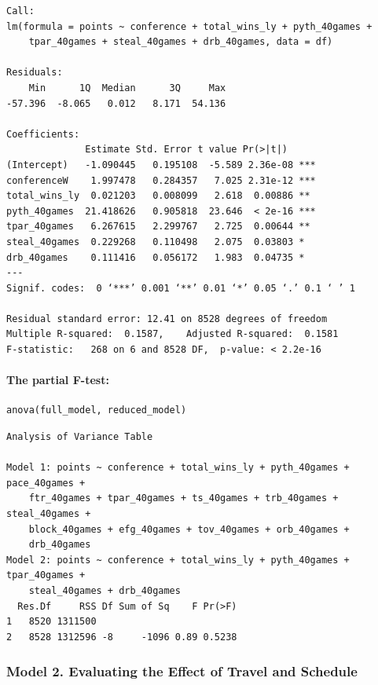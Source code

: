 \documentclass[
    12pt,
    a4paper,
    titlepage,  %
    abstract,  %
    headings=standardclasses,  %
    bibliography=totocnumbered  %
]{scrartcl}
\begin{document}
\begin{Verbatim}
Call:
lm(formula = points ~ conference + total_wins_ly + pyth_40games + 
    tpar_40games + steal_40games + drb_40games, data = df)

Residuals:
    Min      1Q  Median      3Q     Max 
-57.396  -8.065   0.012   8.171  54.136 

Coefficients:
              Estimate Std. Error t value Pr(>|t|)    
(Intercept)   -1.090445   0.195108  -5.589 2.36e-08 ***
conferenceW    1.997478   0.284357   7.025 2.31e-12 ***
total_wins_ly  0.021203   0.008099   2.618  0.00886 ** 
pyth_40games  21.418626   0.905818  23.646  < 2e-16 ***
tpar_40games   6.267615   2.299767   2.725  0.00644 ** 
steal_40games  0.229268   0.110498   2.075  0.03803 *  
drb_40games    0.111416   0.056172   1.983  0.04735 *  
---
Signif. codes:  0 ‘***’ 0.001 ‘**’ 0.01 ‘*’ 0.05 ‘.’ 0.1 ‘ ’ 1

Residual standard error: 12.41 on 8528 degrees of freedom
Multiple R-squared:  0.1587,    Adjusted R-squared:  0.1581 
F-statistic:   268 on 6 and 8528 DF,  p-value: < 2.2e-16
\end{Verbatim}

\paragraph{The partial F-test:}

\begin{verbatim}
anova(full_model, reduced_model)
\end{verbatim}

\begin{Verbatim}[fontsize=\small]
Analysis of Variance Table

Model 1: points ~ conference + total_wins_ly + pyth_40games + pace_40games + 
    ftr_40games + tpar_40games + ts_40games + trb_40games + steal_40games + 
    block_40games + efg_40games + tov_40games + orb_40games + 
    drb_40games
Model 2: points ~ conference + total_wins_ly + pyth_40games + tpar_40games + 
    steal_40games + drb_40games
  Res.Df     RSS Df Sum of Sq    F Pr(>F)
1   8520 1311500                         
2   8528 1312596 -8     -1096 0.89 0.5238
\end{Verbatim}

\subsubsection{Model 2. Evaluating the Effect of Travel and Schedule} \label{model2}
\end{document}
